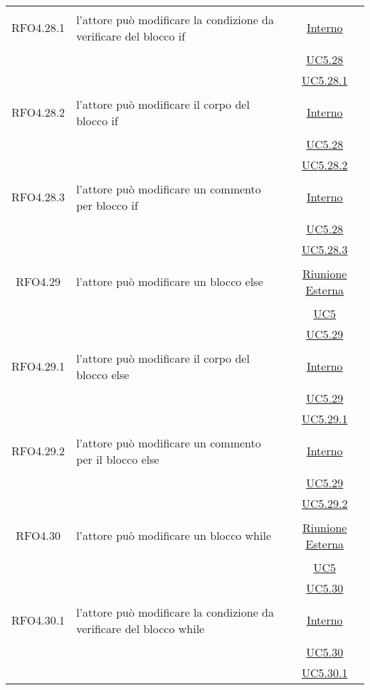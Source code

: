\begin{longtable}{|c|>{\centering}m{7cm}|c|}
\hypertarget{RFO4.28.1}{RFO4.28.1} & l'attore può modificare la condizione da verificare del blocco if & \hyperlink{Interno}{Interno}\\
& &\hyperref[UC5.28]{UC5.28}\\
& &\hyperref[UC5.28.1]{UC5.28.1}\\ \hline

\hypertarget{RFO4.28.2}{RFO4.28.2} & l'attore può modificare il corpo del blocco if & \hyperlink{Interno}{Interno}\\
& &\hyperref[UC5.28]{UC5.28}\\
& &\hyperref[UC5.28.2]{UC5.28.2}\\ \hline

\hypertarget{RFO4.28.3}{RFO4.28.3} & l'attore può modificare un commento per blocco if & \hyperlink{Interno}{Interno}\\
& &\hyperref[UC5.28]{UC5.28}\\
& &\hyperref[UC5.28.3]{UC5.28.3}\\ \hline

\hypertarget{RFO4.29}{RFO4.29} & l'attore può modificare un blocco else & \hyperlink{Riunione Esterna}{Riunione Esterna}\\
& &\hyperref[UC5]{UC5}\\
& &\hyperref[UC5.29]{UC5.29}\\ \hline

\hypertarget{RFO4.29.1}{RFO4.29.1} & l'attore può modificare il corpo del blocco else &\hyperlink{Interno}{Interno}\\
& &\hyperref[UC5.29]{UC5.29}\\
& &\hyperref[UC5.29.1]{UC5.29.1}\\ \hline

\hypertarget{RFO4.29.2}{RFO4.29.2} & l'attore può modificare un commento per il blocco else & \hyperlink{Interno}{Interno}\\
& &\hyperref[UC5.29]{UC5.29}\\
& &\hyperref[UC5.29.2]{UC5.29.2}\\ \hline

\hypertarget{RFO4.30}{RFO4.30} & l'attore può modificare un blocco while & \hyperlink{Riunione Esterna}{Riunione Esterna}\\
& &\hyperref[UC5]{UC5}\\
& &\hyperref[UC5.30]{UC5.30}\\ \hline

\hypertarget{RFO4.30.1}{RFO4.30.1} & l'attore può modificare la condizione da verificare del blocco while & \hyperlink{Interno}{Interno}\\
& &\hyperref[UC5.30]{UC5.30}\\
& &\hyperref[UC5.30.1]{UC5.30.1}\\ \hline


\end{longtable}
